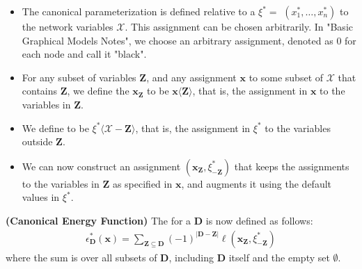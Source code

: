 \documentclass{article}
\newcommand{\bfs}[1]{\textbf{({#1}) }}
\begin{document}
\begin{itemize}
    \item The canonical parameterization is defined relative to a  $\xi^{*}=$ $\left(x_{1}^{*}, \ldots, x_{n}^{*}\right)$ to the network variables $\mathcal{X}$. This assignment can be chosen arbitrarily. In "Basic Graphical Models Notes", we choose an arbitrary assignment, denoted as $0$ for each node and call it "black".
    \item For any subset of variables $\boldsymbol{Z}$, and any assignment $\boldsymbol{x}$ to some subset of $\mathcal{X}$ that contains $\boldsymbol{Z}$, we define the  $\boldsymbol{x}_{\boldsymbol{Z}}$ to be $\boldsymbol{x}\langle\boldsymbol{Z}\rangle$, that is, the assignment in $\boldsymbol{x}$ to the variables in $\boldsymbol{Z}$. 
    \item We define  to be $\xi^{*}\langle\mathcal{X}-\boldsymbol{Z}\rangle$, that is, the assignment in $\xi^{*}$ to the variables outside $\boldsymbol{Z}$.
    \item We can now construct an assignment $\left(\boldsymbol{x}_{\boldsymbol{Z}}, \xi_{-\boldsymbol{Z}}^{*}\right)$ that keeps the assignments to the variables in $\boldsymbol{Z}$ as specified in $\boldsymbol{x}$, and augments it using the default values in $\xi^{*}$.
\end{itemize}

\begin{defa}\bfs{Canonical Energy Function}
The  for a  $\boldsymbol{D}$ is now defined as follows:
\begin{align*}
\epsilon_{\boldsymbol{D}}^{*}(\boldsymbol{x})=\sum_{\boldsymbol{Z} \subseteq \boldsymbol{D}}(-1)^{|\boldsymbol{D}-\boldsymbol{Z}|} \ell\left(\boldsymbol{x}_{\boldsymbol{Z}}, \xi_{-\boldsymbol{Z}}^{*}\right)
\end{align*}
where the sum is over all subsets of $\boldsymbol{D}$, including $\boldsymbol{D}$ itself and the empty set $\emptyset$.
\end{defa}
\end{document}

